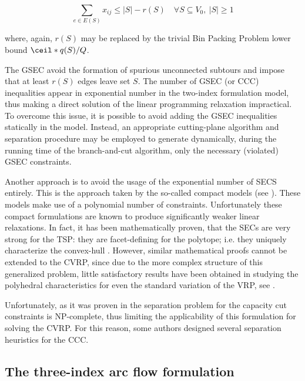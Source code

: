 \begin{equation}\label{eq:cvrp-2flow-gsec}
	\sum_{e \in E(S)} x_{ij} \le |S| - r(S) \quad \forall S \subseteq V_0,\ |S| \ge 1
\end{equation}

where, again, $r(S)$ may be replaced by the trivial Bin Packing Problem lower bound $\ceil*{q(S) / Q}$.

The GSEC avoid the formation of spurious unconnected subtours and impose that at least $r(S)$ edges leave set $S$.
The number of GSEC (or CCC) inequalities appear in exponential number in the two-index formulation model,
thus making a direct solution of the linear programming relaxation impractical.
To overcome this issue, it is possible to avoid adding the GSEC inequalities statically in the model.
Instead, an appropriate cutting-plane algorithm and separation procedure may be employed to generate dynamically,
during the running time of the branch-and-cut algorithm,
only the necessary (violated) GSEC constraints.

Another approach is to avoid the usage of the exponential number of SECS entirely.
This is the approach taken by the so-called compact models (see \cite{miller1960, christofides1979, desrochers1991}).
These models make use of a polynomial number of constraints.
Unfortunately these compact formulations are known to produce significantly weaker linear relaxations.
In fact, it has been mathematically proven,
that the SECs are very strong for the TSP: they are facet-defining for the polytope;
i.e. they uniquely characterize the convex-hull \parencite{grotschel1975}.
However, similar mathematical proofs cannot be extended to the CVRP,
since due to the more complex structure of this generalized problem,
little satisfactory results have been obtained in studying the polyhedral characteristics
for even the standard variation of the VRP, see \textcite{campos1991, cornuejols1993}.

Unfortunately, as it was proven in \textcite{augerat1995} the separation problem
for the capacity cut constraints is NP-complete, thus limiting the applicability
of this formulation for solving the CVRP.
For this reason, some authors \parencite{augerat1995, augerat1998, ralphs2003} designed
several separation heuristics for the CCC.

\subsection{The three-index arc flow formulation}
\label{sec:intro-cvrp-three-index-flow-formulation}

